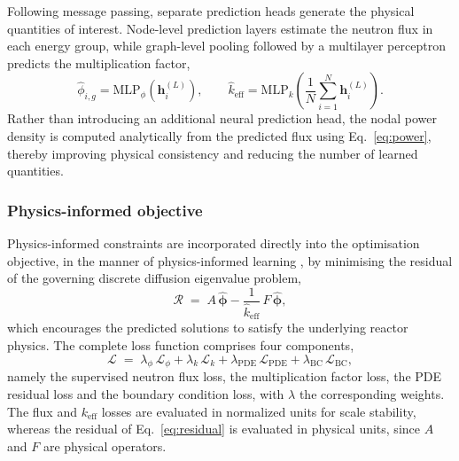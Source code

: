 \documentclass[preprint,12pt]{elsarticle}
\newcommand{\keff}{k_{\mathrm{eff}}}
\begin{document}
Following message passing, separate prediction heads generate the physical
quantities of interest. Node-level prediction layers estimate the neutron flux
in each energy group, while graph-level pooling followed by a multilayer
perceptron predicts the multiplication factor,
\begin{equation}
\hat{\phi}_{i,g} = \mathrm{MLP}_{\phi}\!\left(\mathbf{h}_i^{(L)}\right),
\qquad
\hat{k}_{\mathrm{eff}} = \mathrm{MLP}_{k}\!\left(
\frac{1}{N}\sum_{i=1}^{N}\mathbf{h}_i^{(L)}\right).
\label{eq:heads}
\end{equation}
Rather than introducing an additional neural prediction head, the nodal power
density is computed analytically from the predicted flux using
Eq.~\eqref{eq:power}, thereby improving physical consistency and reducing the
number of learned quantities.

\subsubsection{Physics-informed objective}
\label{sec:loss}

Physics-informed constraints are incorporated directly into the optimisation
objective, in the manner of physics-informed learning
\citep{raissi2019,sarkar2025}, by minimising the residual of the governing
discrete diffusion eigenvalue problem,
\begin{equation}
\mathcal{R} \;=\; A\,\hat{\boldsymbol{\phi}}
- \frac{1}{\hat{k}_{\mathrm{eff}}}\,F\,\hat{\boldsymbol{\phi}},
\label{eq:residual}
\end{equation}
which encourages the predicted solutions to satisfy the underlying reactor
physics. The complete loss function comprises four components,
\begin{equation}
\mathcal{L} \;=\;
\lambda_{\phi}\,\mathcal{L}_{\phi}
+ \lambda_{k}\,\mathcal{L}_{k}
+ \lambda_{\mathrm{PDE}}\,\mathcal{L}_{\mathrm{PDE}}
+ \lambda_{\mathrm{BC}}\,\mathcal{L}_{\mathrm{BC}},
\label{eq:loss}
\end{equation}
namely the supervised neutron flux loss, the multiplication factor loss, the
PDE residual loss and the boundary condition loss, with $\lambda$ the
corresponding weights. The flux and $\keff$ losses are evaluated in normalized
units for scale stability, whereas the residual of Eq.~\eqref{eq:residual} is
evaluated in physical units, since $A$ and $F$ are physical operators.
\end{document}
